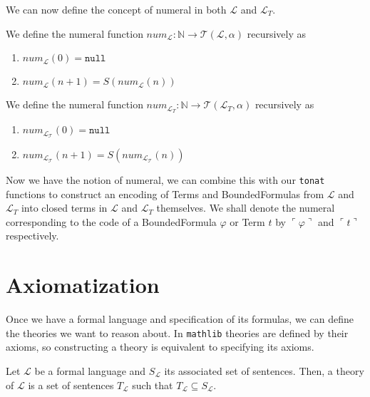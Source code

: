 We can now define the concept of numeral in both $\mathcal{L}$ and $\mathcal{L}_T$.
\begin{definition}\label{def:L-Numeral}
  \leanok
  We define the numeral function $num_{\mathcal{L}} : \mathbb{N} \to \mathcal{T}(\mathcal{L},\alpha)$ recursively as
  \begin{enumerate}
  \item $num_{\mathcal{L}}(0) = \texttt{null}$
  \item $num_{\mathcal{L}}(n + 1) = S(num_{\mathcal{L}}(n))$
  \end{enumerate}
\end{definition}

\begin{definition}\label{def:L_T-Numeral}
  \leanok
  We define the numeral function $num_{\mathcal{L}_T} : \mathbb{N} \to \mathcal{T}(\mathcal{L}_T,\alpha)$ recursively as
  \begin{enumerate}
  \item $num_{\mathcal{L_T}}(0) = \texttt{null}$
  \item $num_{\mathcal{L_T}}(n + 1) = S(num_{\mathcal{L_T}}(n))$
  \end{enumerate}
\end{definition}

Now we have the notion of numeral, we can combine this with our \texttt{tonat} functions to construct an encoding of Terms and BoundedFormulas from $\mathcal{L}$ and $\mathcal{L}_T$ into closed terms in $\mathcal{L}$ and $\mathcal{L}_T$ themselves. We shall denote the numeral corresponding to the code of a BoundedFormula $\varphi$ or Term $t$ by $\ulcorner \varphi \urcorner$ and $\ulcorner t \urcorner$ respectively. 

\section{Axiomatization}\label{subsec:axiomatization}
Once we have a formal language and specification of its formulas, we can define the theories we want to reason about. In \texttt{mathlib} theories are defined by their axioms, so constructing a theory is equivalent to specifying its axioms. 

\begin{definition}[Theory]\label{def:FO-Theory}
  \leanok
  Let $\mathcal{L}$ be a formal language and $S_{\mathcal{L}}$ its associated set of sentences. Then, a theory of $\mathcal{L}$ is a set of sentences $T_{\mathcal{L}}$ such that $T_{\mathcal{L}} \subseteq S_{\mathcal{L}}$.
\end{definition}

